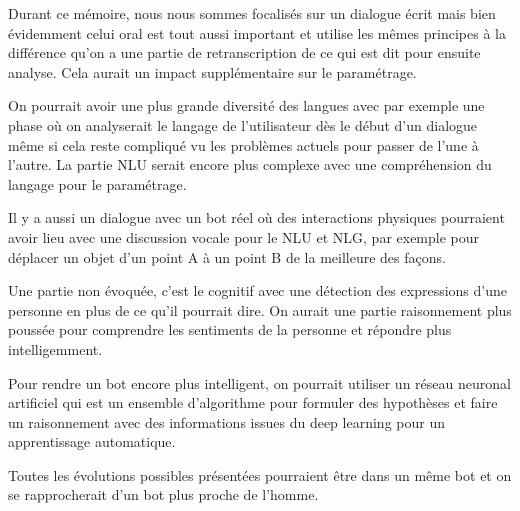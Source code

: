 Durant ce mémoire, nous nous sommes focalisés sur un dialogue écrit mais bien évidemment celui oral est tout aussi important et utilise les mêmes principes à la différence qu’on a une partie de retranscription de ce qui est dit pour ensuite analyse. Cela aurait un impact supplémentaire sur le paramétrage.
\vspace{1em}

On pourrait avoir une plus grande diversité des langues avec par exemple une phase où on analyserait le langage de l’utilisateur dès le début d’un dialogue même si cela reste compliqué vu les problèmes actuels pour passer de l’une à l’autre. La partie NLU serait encore plus complexe avec une compréhension du langage pour le paramétrage.
\vspace{1em}

Il y a aussi un dialogue avec un bot réel où des interactions physiques pourraient avoir lieu avec une discussion vocale pour le NLU et NLG,  par exemple pour déplacer un objet d’un point A à un point B de la meilleure des façons. 
\vspace{1em}

Une partie non évoquée, c’est le cognitif avec une détection des expressions d’une personne en plus de ce qu’il pourrait dire. On aurait une partie raisonnement plus poussée pour comprendre les sentiments de la personne et répondre plus intelligemment.
\vspace{1em}

Pour rendre un bot encore plus intelligent, on pourrait utiliser un réseau neuronal artificiel qui est un ensemble d’algorithme pour formuler des hypothèses et faire un raisonnement avec des informations issues du deep learning pour un apprentissage automatique.
\vspace{1em}

Toutes les évolutions possibles présentées pourraient être dans un même bot et on se rapprocherait d'un bot plus proche de l'homme. 
